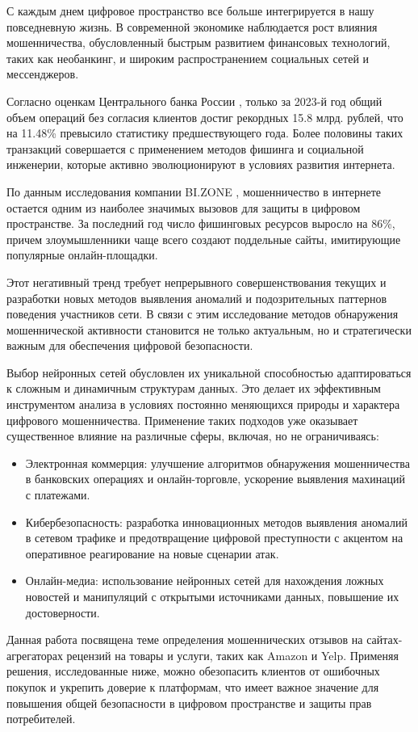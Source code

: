 
С каждым днем цифровое пространство все больше интегрируется в нашу повседневную жизнь. В современной экономике наблюдается рост влияния мошенничества, обусловленный быстрым развитием финансовых технологий, таких как необанкинг, и широким распространением социальных сетей и мессенджеров.

Согласно оценкам Центрального банка России \cite{cbr2024}, только за 2023-й год общий объем операций без согласия клиентов достиг рекордных 15.8 млрд. рублей, что на 11.48\% превысило статистику предшествующего года. Более половины таких транзакций совершается с применением методов фишинга и социальной инженерии, которые активно эволюционируют в условиях развития интернета.

По данным исследования компании BI.ZONE \cite{bizone2023}, мошенничество в интернете остается одним из наиболее значимых вызовов для защиты в цифровом пространстве. За последний год число фишинговых ресурсов выросло на 86\%, причем злоумышленники чаще всего создают поддельные сайты, имитирующие популярные онлайн-площадки.

Этот негативный тренд требует непрерывного совершенствования текущих и разработки новых методов выявления аномалий и подозрительных паттернов поведения участников сети. В связи с этим исследование методов обнаружения мошеннической активности становится не только актуальным, но и стратегически важным для обеспечения цифровой безопасности.

Выбор нейронных сетей обусловлен их уникальной способностью адаптироваться к сложным и динамичным структурам данных. Это делает их эффективным инструментом анализа в условиях постоянно меняющихся природы и характера цифрового мошенничества. Применение таких подходов уже оказывает существенное влияние на различные сферы, включая, но не ограничиваясь:

\begin{itemize}
    \item Электронная коммерция: улучшение алгоритмов обнаружения мошенничества в банковских операциях и онлайн-торговле, ускорение выявления махинаций с платежами.

    \item Кибербезопасность: разработка инновационных методов выявления аномалий в сетевом трафике и предотвращение цифровой преступности с акцентом на оперативное реагирование на новые сценарии атак.

    \item Онлайн-медиа: использование нейронных сетей для нахождения ложных новостей и манипуляций с открытыми источниками данных, повышение их достоверности.
\end{itemize}

Данная работа посвящена теме определения мошеннических отзывов на сайтах-агрегаторах рецензий на товары и услуги, таких как Amazon и Yelp. Применяя решения, исследованные ниже, можно обезопасить клиентов от ошибочных покупок и укрепить доверие к платформам, что имеет важное значение для повышения общей безопасности в цифровом пространстве и защиты прав потребителей.

\pagebreak
